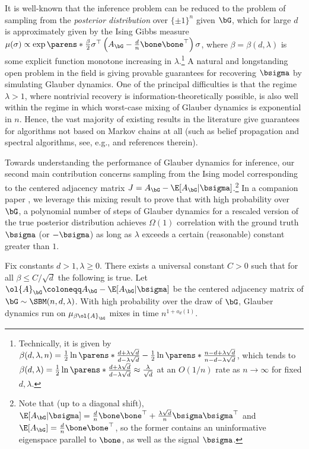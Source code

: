 \documentclass[11pt,letterpaper]{article}
\begin{document}
It is well-known that the inference problem can be reduced to the problem of sampling from the \emph{posterior distribution} over $\{\pm1\}^{n}$ given $\bG$, which for large $d$ is approximately given by the Ising Gibbs measure $\mu(\sigma) \propto \exp\parens*{\frac{\beta}{2} \sigma^{\top} \left( A_{\bG} - \frac{d}{n} \bone\bone^\top \right) \sigma}$, where $\beta = \beta(d,\lambda)$ is some explicit function monotone increasing in $\lambda$.\footnote{Technically, it is given by $\beta(d,\lambda,n) = \frac{1}{2}\ln\parens*{\frac{d+\lambda\sqrt{d}}{d-\lambda\sqrt{d}}} - \frac{1}{2}\ln\parens*{\frac{n-d+\lambda\sqrt{d}}{n-d-\lambda\sqrt{d}}}$, which tends to $\beta(d,\lambda) = \frac{1}{2} \ln\parens*{\frac{d+\lambda\sqrt{d}}{d-\lambda\sqrt{d}}} \approx \frac{\lambda}{\sqrt{d}}$ at an $O(1/n)$ rate as $n \to \infty$ for fixed $d, \lambda$.} A natural and longstanding open problem in the field is giving provable guarantees for recovering $\bsigma$ by simulating Glauber dynamics. One of the principal difficulties is that the regime $\lambda > 1$, where nontrivial recovery is information-theoretically possible, is also well within the regime in which worst-case mixing of Glauber dynamics is exponential in $n$. Hence, the vast majority of existing results in the literature give guarantees for algorithms not based on Markov chains at all (such as belief propagation and spectral algorithms, see, e.g., \cite{DKMZ11,Mas14,MNS14,AS15,BLM15,MNS15,MNS18,PY23} and references therein).

Towards understanding the performance of Glauber dynamics for inference, our second main contribution concerns sampling from the Ising model corresponding to the centered adjacency matrix $J = A_{\bG} - \E[A_{\bG}|\bsigma]$.\footnote{Note that (up to a diagonal shift), $\E[A_{\bG} | \bsigma] = \frac{d}{n} \bone\bone^{\top} + \frac{\lambda \sqrt{d}}{n} \bsigma\bsigma^{\top}$ and $\E[A_{\bG}] = \frac{d}{n}\bone\bone^{\top}$, so the former contains an uninformative eigenspace parallel to $\bone$, as well as the signal $\bsigma$.} In a companion paper \cite{LMRRW24},
we leverage this mixing result to prove that with high probability over $\bG$, a polynomial number of steps of Glauber dynamics for a rescaled version of the true posterior distribution achieves $\Omega(1)$ correlation with the ground truth $\bsigma$ (or $-\bsigma$) as long as $\lambda$ exceeds a certain (reasonable) constant greater than $1$.
\begin{theorem}
    \label{thm:main-centered}
    Fix constants $d > 1, \lambda \geq 0$. There exists a universal constant $C > 0$ such that for all $\beta \leq C/\sqrt{d}$ the following is true. Let $\ol{A}_{\bG} \coloneqq A_{\bG} - \E[A_{\bG}|\bsigma]$ be the centered adjacency matrix of $\bG \sim \SBM(n, d, \lambda)$. With high probability over the draw of $\bG$, Glauber dynamics run on $\mu_{\beta\ol{A}_{\bG}}$ mixes in time $n^{1+o_d(1)}$.
\end{theorem}
\end{document}
